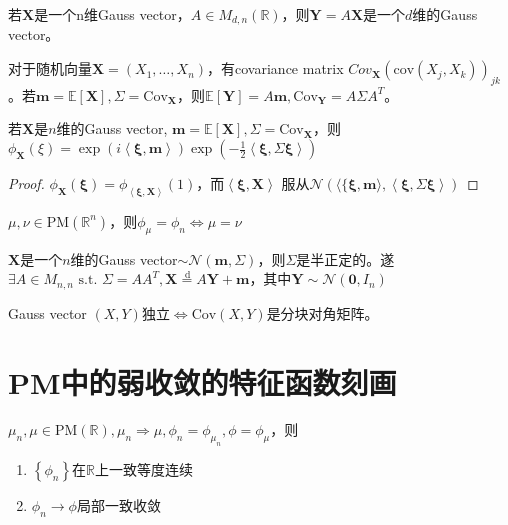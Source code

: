\documentclass{ctexart}
\begin{document}
\begin{Eg}
  若$\mathbf{X}$是一个n维Gauss vector，$A\in M_{d,n}(\mathbb{R})$，则$\mathbf{Y}=A \mathbf{X}$是一个$d$维的Gauss vector。
\end{Eg}

对于随机向量$\mathbf{X}=(X_1,\dots, X_n)$，有covariance matrix $Cov_{\mathbf{X}}(\mathrm{cov}(X_j,X_k))_{jk}$。若$\mathbf{m}=\mathbb{E}\left[ \mathbf{X} \right], \Sigma= \mathrm{Cov}_{\mathbf{X}} $，则$\mathbb{E}\left[ \mathbf{Y} \right ]= A\mathbf{m}, \mathrm{Cov}_{\mathbf{Y}}=A\Sigma A^T $。

\begin{Prop}
  若$\mathbf{X}$是$n$维的Gauss vector, $\mathbf{m}= \mathbb{E}\left[ \mathbf{X} \right], \Sigma= \mathrm{Cov}_{\mathbf{X}} $，则$\phi_{\mathbf{X}}(\xi)=\exp(i \left\langle \mathbf{\xi}, \mathbf{m} \right\rangle)\exp(-\frac{1}{2} \left\langle \mathbf{\xi}, \Sigma \mathbf{\xi} \right\rangle)$
\end{Prop}

\begin{proof}
  $\phi_{\mathbf{X}}(\mathbf{\xi})=\phi_{\left\langle \mathbf{\xi},\mathbf{X} \right\rangle}(1)$，而$\left\langle \mathbf{\xi}, \mathbf{X} \right\rangle$ 服从$\mathcal{N}(\langle\{ \mathbf{\xi},\mathbf{m} \rangle, \left\langle  \mathbf{\xi}, \Sigma \mathbf{\xi}\right\rangle)$
\end{proof}

\begin{Prop}
  $\mu,\nu\in \mathrm{PM}(\mathbb{R}^n)$，则$\phi_{\mu}=\phi_n \Leftrightarrow \mu=\nu$
\end{Prop}

\begin{Prop}
  $\mathbf{X}$是一个$n$维的Gauss vector$\sim \mathcal{N}(\mathbf{m}, \Sigma)$，则$\Sigma$是半正定的。遂$\exists A\in M_{n,n} \text{ s.t. } \Sigma= AA^T, \mathbf{X} \stackrel{\,\mathrm{d}}{=}  A\mathbf{Y}+\mathbf{m}$，其中$\mathbf{Y}\sim  \mathcal{N}(\mathbf{0}, I_n)$
\end{Prop}

\begin{Prop}
  Gauss vector $(X,Y)$独立$\Leftrightarrow \mathrm{Cov}(X,Y)$是分块对角矩阵。
\end{Prop}

\section{PM中的弱收敛的特征函数刻画}
\begin{Prop}
 $\mu_n,\mu\in \mathrm{PM}(\mathbb{R}), \mu_n\Rightarrow \mu, \phi_n=\phi_{\mu_n}, \phi=\phi_{\mu}$，则
\begin{enumerate}
\item $\left\{ \phi_n \right\}$在$\mathbb{R}$上一致等度连续
\item $\phi_n\to \phi$局部一致收敛
\end{enumerate}
\end{Prop}
\end{document}
